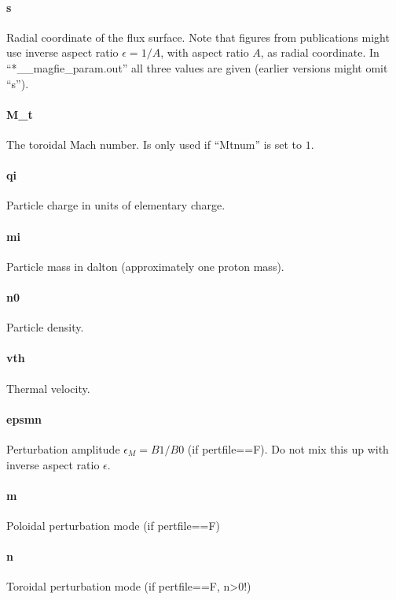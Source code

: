 \paragraph{s}
Radial coordinate of the flux surface. Note that figures from
publications might use inverse aspect ratio $\epsilon = 1/A$, with
aspect ratio $A$, as radial coordinate. In ``*__magfie_param.out'' all
three values are given (earlier versions might omit ``s'').

\paragraph{M\_t}
The toroidal Mach number. Is only used if ``Mtnum'' is set to $1$.

\paragraph{qi}
Particle charge in units of elementary charge.

\paragraph{mi}
Particle mass in dalton (approximately one proton mass).

\paragraph{n0}
Particle density.

\paragraph{vth}
Thermal velocity.

\paragraph{epsmn}
Perturbation amplitude $\epsilon_{M} = B1/B0$ (if pertfile==F).
Do not mix this up with inverse aspect ratio $\epsilon$.

\paragraph{m}
Poloidal perturbation mode (if pertfile==F)

\paragraph{n}
Toroidal perturbation mode (if pertfile==F, n>0!)

